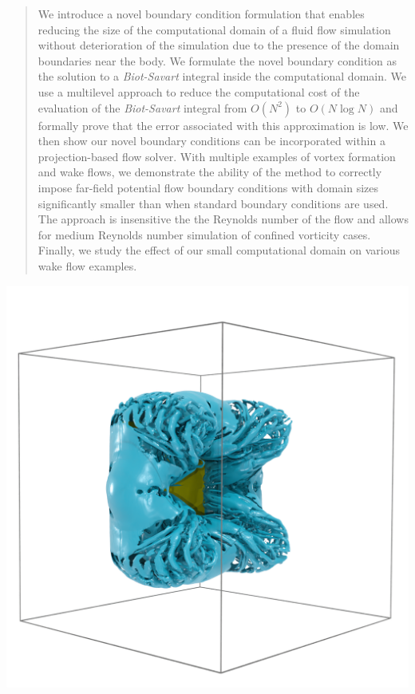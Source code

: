 \documentclass[preprint,12pt]{elsarticle}
\begin{document}
\begin{frontmatter}
\begin{abstract}
We introduce a novel boundary condition formulation that enables reducing the size of the computational domain of a fluid flow simulation without deterioration of the simulation due to the presence of the domain boundaries near the body. We formulate the novel boundary condition as the solution to a \emph{Biot-Savart} integral inside the computational domain. We use a multilevel approach to reduce the computational cost of the evaluation of the \emph{Biot-Savart} integral from $O(N^2)$ to $O(N\log N)$ and formally prove that the error associated with this approximation is low. We then show our novel boundary conditions can be incorporated within a projection-based flow solver. With multiple examples of vortex formation and wake flows, we demonstrate the ability of the method to correctly impose far-field potential flow boundary conditions with domain sizes significantly smaller than when standard boundary conditions are used. The approach is insensitive the the Reynolds number of the flow and allows for medium Reynolds number simulation of confined vorticity cases. Finally, we study the effect of our small computational domain on various wake flow examples.
\end{abstract}

\begin{graphicalabstract}
\includegraphics[width=1.1\textwidth]{tex/fig/disk_high_re_7.png}
\end{graphicalabstract}


\end{frontmatter}
\end{document}

